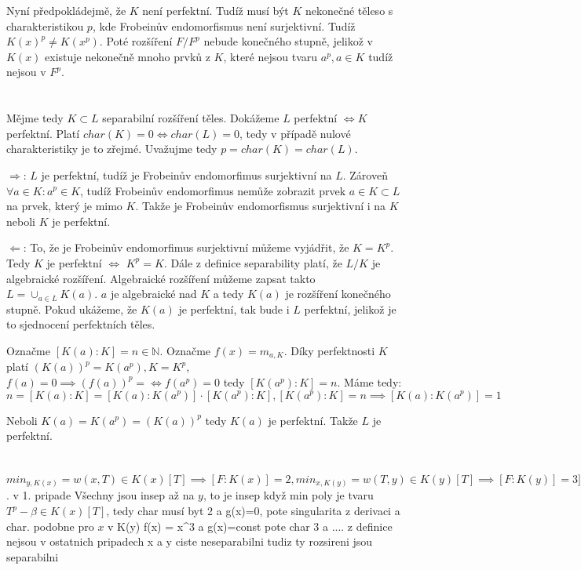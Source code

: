 \documentclass[12pt, a4paper]{article}
\begin{document}
Nyní předpokládejmě, že $K$ není perfektní. Tudíž musí být $K$ nekonečné těleso s charakteristikou $p$, kde Frobeinův endomorfismus není surjektivní. Tudíž $K(x)^p \neq K(x^p)$. Poté rozšíření $F/F^p$ nebude konečného stupně, jelikož v $K(x)$ existuje nekonečně mnoho prvků z $K$, které nejsou tvaru $a^p, a \in K$ tudíž nejsou v $F^p$.

\section{}
Mějme tedy $K \subset L$ separabilní rozšíření těles. Dokážeme $L$ perfektní $\iff K$ perfektní. Platí $char(K) = 0 \iff char(L) = 0$, tedy v případě nulové charakteristiky je to zřejmé. Uvažujme tedy $p = char(K) = char(L)$.

$\Rightarrow$: $L$ je perfektní, tudíž je Frobeinův endomorfimus surjektivní na $L$. Zároveň $\forall a \in K: a^p \in K$, tudíž Frobeinův endomorfimus nemůže zobrazit prvek $a \in K \subset L$ na prvek, který je mimo $K$. Takže je Frobeinův endomorfismus surjektivní i na $K$ neboli $K$ je perfektní.

$\Leftarrow$: To, že je Frobeinův endomorfimus surjektivní můžeme vyjádřit, že $K = K^p$. Tedy $K$ je perfektní $\iff$ $K^p = K$. Dále z definice separability platí, že $L/K$ je algebraické rozšíření. Algebraické rozšíření můžeme zapsat takto $L = \cup_{a\in L} K(a)$. $a$ je algebraické nad $K$ a tedy $K(a)$ je rozšíření konečného stupně. Pokud ukážeme, že $K(a)$ je perfektní, tak bude i $L$ perfektní, jelikož je to sjednocení perfektních těles.

Označme $[K(a):K]=n \in \mathbb{N}$. Označme $f(x)=m_{a,K}$. Díky perfektnosti $K$ platí $(K(a))^p = K(a^p), K = K^p$, $f(a)=0 \implies (f(a))^p = \iff f(a^p)=0$ tedy $[K(a^p):K] = n$. Máme tedy:
\[
n=[K(a):K]=[K(a):K(a^p)]\cdot [K(a^p):K], [K(a^p):K] =n \implies [K(a):K(a^p)] = 1
\]

Neboli $K(a)=K(a^p)=(K(a))^p$ tedy $K(a)$ je perfektní. Takže $L$ je perfektní.

\section{}
$min_{y,K(x)} = w(x,T) \in K(x)[T] \implies [F:K(x)] = 2, min_{x,K(y)} = w(T,y) \in K(y)[T] \implies [F:K(y)] = 3]$. v 1. pripade Všechny jsou insep až na $y$, to je insep když min poly je tvaru $T^p - \beta \in K(x)[T]$, tedy char musí byt 2 a g(x)=0, pote singularita z derivaci a char. podobne pro $x$ v K(y) f(x) = x^3 a g(x)=const pote char 3 a .... z definice nejsou v ostatnich pripadech x a y ciste neseparabilni tudiz ty rozsireni jsou separabilni
\end{document}
